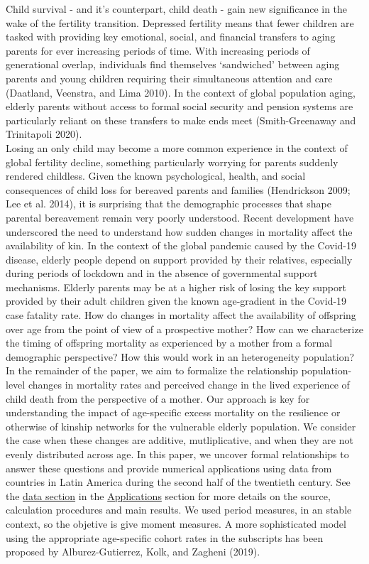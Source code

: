 \documentclass[
]{article}
\begin{document}
Child survival - and it's counterpart, child death - gain new
significance in the wake of the fertility transition. Depressed
fertility means that fewer children are tasked with providing key
emotional, social, and financial transfers to aging parents for ever
increasing periods of time. With increasing periods of generational
overlap, individuals find themselves `sandwiched' between aging parents
and young children requiring their simultaneous attention and care
(Daatland, Veenstra, and Lima 2010). In the context of global population
aging, elderly parents without access to formal social security and
pension systems are particularly reliant on these transfers to make ends
meet (Smith-Greenaway and Trinitapoli 2020).\\
Losing an only child may become a more common experience in the context
of global fertility decline, something particularly worrying for parents
suddenly rendered childless. Given the known psychological, health, and
social consequences of child loss for bereaved parents and families
(Hendrickson 2009; Lee et al. 2014), it is surprising that the
demographic processes that shape parental bereavement remain very poorly
understood. Recent development have underscored the need to understand
how sudden changes in mortality affect the availability of kin. In the
context of the global pandemic caused by the Covid-19 disease, elderly
people depend on support provided by their relatives, especially during
periods of lockdown and in the absence of governmental support
mechanisms. Elderly parents may be at a higher risk of losing the key
support provided by their adult children given the known age-gradient in
the Covid-19 case fatality rate. How do changes in mortality affect the
availability of offspring over age from the point of view of a
prospective mother? How can we characterize the timing of offspring
mortality as experienced by a mother from a formal demographic
perspective? How this would work in an heterogeneity population? In the
remainder of the paper, we aim to formalize the relationship
population-level changes in mortality rates and perceived change in the
lived experience of child death from the perspective of a mother. Our
approach is key for understanding the impact of age-specific excess
mortality on the resilience or otherwise of kinship networks for the
vulnerable elderly population. We consider the case when these changes
are additive, mutliplicative, and when they are not evenly distributed
across age. In this paper, we uncover formal relationships to answer
these questions and provide numerical applications using data from
countries in Latin America during the second half of the twentieth
century. See the \protect\hyperlink{Data}{data section} in the
\protect\hyperlink{Applications}{Applications} section for more details
on the source, calculation procedures and main results. We used period
measures, in an stable context, so the objetive is give moment measures.
A more sophisticated model using the appropriate age-specific cohort
rates in the subscripts has been proposed by Alburez-Gutierrez, Kolk,
and Zagheni (2019).
\end{document}
